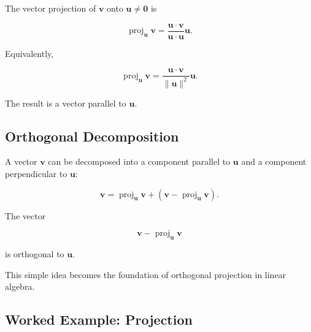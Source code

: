 The vector projection of \(\mathbf{v}\) onto
\(\mathbf{u}\neq\mathbf{0}\) is

\[
\boxed{
\operatorname{proj}_{\mathbf{u}}\mathbf{v}
=
\frac{\mathbf{u}\cdot\mathbf{v}}
{\mathbf{u}\cdot\mathbf{u}}
\mathbf{u}.
}
\]

Equivalently,

\[
\operatorname{proj}_{\mathbf{u}}\mathbf{v}
=
\frac{\mathbf{u}\cdot\mathbf{v}}
{\|\mathbf{u}\|^2}
\mathbf{u}.
\]

The result is a vector parallel to \(\mathbf{u}\).

\subsection{Orthogonal Decomposition}
\label{subsec:orthogonal-decomposition-vector}

A vector \(\mathbf{v}\) can be decomposed into a component parallel to
\(\mathbf{u}\) and a component perpendicular to \(\mathbf{u}\):

\[
\boxed{
\mathbf{v}
=
\operatorname{proj}_{\mathbf{u}}\mathbf{v}
+
\left(
\mathbf{v}
-
\operatorname{proj}_{\mathbf{u}}\mathbf{v}
\right).
}
\]

The vector

\[
\mathbf{v}
-
\operatorname{proj}_{\mathbf{u}}\mathbf{v}
\]

is orthogonal to \(\mathbf{u}\).

This simple idea becomes the foundation of orthogonal projection in linear
algebra.

\subsection{Worked Example: Projection}
\label{subsec:worked-vector-projection}

